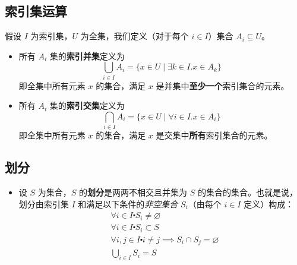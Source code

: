 \subsection{索引集运算}

假设 $I$ 为索引集，$U$ 为全集，我们定义（对于每个 $i \in I$）集合 $A_i \subseteq U$。

\begin{itemize}
    \item 所有 $A_i$ 集的\textbf{索引并集}定义为
        \[\bigcup_{i \in I}A_i = \{x \in U \mid \exists k \in I. x \in A_k\}\]
        即全集中所有元素 $x$ 的集合，满足 $x$ 是并集中\textbf{至少一个}索引集合的元素。
    \item 所有 $A_i$ 集的\textbf{索引交集}定义为
        \[\bigcap_{i \in I}A_i = \{x \in U \mid \forall i \in I.x \in A_i\}\]
        即全集中所有元素 $x$ 的集合，满足 $x$ 是交集中\textbf{所有}索引集合的元素。
\end{itemize}

\subsection{划分}

\begin{itemize}
    \item 设 $S$ 为集合，$S$ 的\textbf{划分}是两两不相交且并集为 $S$ 的集合的集合。也就是说，划分由索引集 $I$ 和满足以下条件的\emph{非空集合} $S_i$（由每个 $i \in I$ 定义）构成：
        \begin{align*}
            & \forall i \in I \centerdot S_i \ne \varnothing\\
            & \forall i \in I \centerdot S_i \subset S\\
            & \forall i,j \in I \centerdot i \ne j \implies S_i \cap S_j = \varnothing\\
            & \bigcup_{i \in I} S_i= S
        \end{align*}
\end{itemize}


